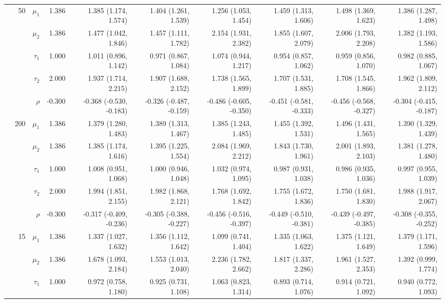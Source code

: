 \documentclass[
]{article}
\begin{document}
\begin{table}
\begin{tabular}[t]{rrrrrrrrrr}
\addlinespace
 & 50 & $\mu_1$ & 1.386 & 1.385 (1.174, 1.574) & 1.404 (1.261, 1.539) & 1.256 (1.053, 1.454) & 1.459 (1.313, 1.606) & 1.498 (1.369, 1.623) & 1.386 (1.287, 1.498)\\
 &  & $\mu_2$ & 1.386 & 1.477 (1.042, 1.846) & 1.457 (1.111, 1.782) & 2.154 (1.931, 2.382) & 1.855 (1.607, 2.079) & 2.006 (1.793, 2.208) & 1.382 (1.193, 1.586)\\
 &  & $\tau_1$ & 1.000 & 1.011 (0.896, 1.142) & 0.971 (0.867, 1.084) & 1.074 (0.944, 1.217) & 0.954 (0.857, 1.062) & 0.959 (0.856, 1.070) & 0.982 (0.885, 1.067)\\
 &  & $\tau_2$ & 2.000 & 1.937 (1.714, 2.215) & 1.907 (1.688, 2.152) & 1.738 (1.565, 1.899) & 1.707 (1.531, 1.885) & 1.708 (1.545, 1.866) & 1.962 (1.809, 2.112)\\
 &  & $\rho$ & -0.300 & -0.368 (-0.530, -0.183) & -0.326 (-0.487, -0.159) & -0.486 (-0.605, -0.350) & -0.451 (-0.581, -0.333) & -0.456 (-0.568, -0.327) & -0.304 (-0.415, -0.187)\\
\addlinespace
 & 200 & $\mu_1$ & 1.386 & 1.379 (1.280, 1.483) & 1.389 (1.313, 1.467) & 1.385 (1.243, 1.485) & 1.455 (1.392, 1.531) & 1.496 (1.431, 1.565) & 1.390 (1.329, 1.439)\\
 &  & $\mu_2$ & 1.386 & 1.385 (1.174, 1.616) & 1.395 (1.225, 1.554) & 2.084 (1.969, 2.212) & 1.843 (1.730, 1.961) & 2.001 (1.893, 2.103) & 1.381 (1.278, 1.480)\\
 &  & $\tau_1$ & 1.000 & 1.008 (0.951, 1.068) & 1.000 (0.946, 1.048) & 1.032 (0.974, 1.095) & 0.987 (0.931, 1.038) & 0.986 (0.935, 1.036) & 0.997 (0.955, 1.039)\\
 &  & $\tau_2$ & 2.000 & 1.994 (1.851, 2.155) & 1.982 (1.868, 2.121) & 1.768 (1.692, 1.842) & 1.755 (1.672, 1.836) & 1.750 (1.681, 1.830) & 1.988 (1.917, 2.067)\\
 &  & $\rho$ & -0.300 & -0.317 (-0.409, -0.236) & -0.305 (-0.388, -0.227) & -0.456 (-0.516, -0.397) & -0.449 (-0.510, -0.381) & -0.439 (-0.497, -0.385) & -0.308 (-0.355, -0.252)\\
\addlinespace
4 & 15 & $\mu_1$ & 1.386 & 1.337 (1.027, 1.632) & 1.356 (1.112, 1.642) & 1.099 (0.741, 1.404) & 1.335 (1.063, 1.622) & 1.375 (1.121, 1.649) & 1.379 (1.171, 1.596)\\
 &  & $\mu_2$ & 1.386 & 1.678 (1.093, 2.184) & 1.553 (1.013, 2.040) & 2.236 (1.782, 2.662) & 1.817 (1.337, 2.286) & 1.961 (1.527, 2.353) & 1.392 (0.999, 1.774)\\
 &  & $\tau_1$ & 1.000 & 0.972 (0.758, 1.180) & 0.925 (0.731, 1.108) & 1.063 (0.823, 1.314) & 0.893 (0.714, 1.076) & 0.914 (0.721, 1.092) & 0.940 (0.772, 1.093)\\

\end{tabular}
\end{table}
\end{document}
